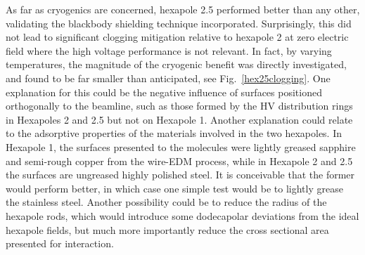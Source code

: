 As far as cryogenics are concerned, hexapole 2.5 performed better than any other, validating the blackbody shielding technique incorporated.
Surprisingly, this did not lead to significant clogging mitigation relative to hexapole 2 at zero electric field where the high voltage performance is not relevant.
In fact, by varying temperatures, the magnitude of the cryogenic benefit was directly investigated, and found to be far smaller than anticipated, see Fig.~\ref{hex25clogging}.
One explanation for this could be the negative influence of surfaces positioned orthogonally to the beamline, such as those formed by the HV distribution rings in Hexapoles 2 and 2.5 but not on Hexapole 1.
Another explanation could relate to the adsorptive properties of the materials involved in the two hexapoles.
In Hexapole 1, the surfaces presented to the molecules were lightly greased sapphire and semi-rough copper from the wire-EDM process, while in Hexapole 2 and 2.5 the surfaces are ungreased highly polished steel.
It is conceivable that the former would perform better, in which case one simple test would be to lightly grease the stainless steel.
Another possibility could be to reduce the radius of the hexapole rods, which would introduce some dodecapolar deviations from the ideal hexapole fields, but much more importantly reduce the cross sectional area presented for interaction.



